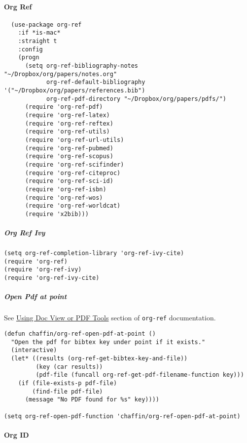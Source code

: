 \documentclass[11pt]{article}
\begin{document}
\paragraph*{Org Ref}
\label{sec:org1457968}

\begin{verbatim}
  (use-package org-ref
    :if *is-mac*
    :straight t
    :config
    (progn
      (setq org-ref-bibliography-notes "~/Dropbox/org/papers/notes.org"
            org-ref-default-bibliography '("~/Dropbox/org/papers/references.bib")
            org-ref-pdf-directory "~/Dropbox/org/papers/pdfs/")
      (require 'org-ref-pdf)
      (require 'org-ref-latex)
      (require 'org-ref-reftex)
      (require 'org-ref-utils)
      (require 'org-ref-url-utils)
      (require 'org-ref-pubmed)
      (require 'org-ref-scopus)
      (require 'org-ref-scifinder)
      (require 'org-ref-citeproc)
      (require 'org-ref-sci-id)
      (require 'org-ref-isbn)
      (require 'org-ref-wos)
      (require 'org-ref-worldcat)
      (require 'x2bib)))
\end{verbatim}

\subparagraph*{Org Ref Ivy}
\label{sec:org4a9ee6e}

\begin{verbatim}
(setq org-ref-completion-library 'org-ref-ivy-cite)
(require 'org-ref)
(require 'org-ref-ivy)
(require 'org-ref-ivy-cite)
\end{verbatim}

\subparagraph*{Open Pdf at point}
\label{sec:org442fd21}

See \href{https://github.com/jkitchin/org-ref/blob/master/org-ref.org\#using-doc-view-or-pdf-tools}{Using Doc View or PDF Tools} section of \texttt{org-ref} documentation.

\begin{verbatim}
(defun chaffin/org-ref-open-pdf-at-point ()
  "Open the pdf for bibtex key under point if it exists."
  (interactive)
  (let* ((results (org-ref-get-bibtex-key-and-file))
         (key (car results))
         (pdf-file (funcall org-ref-get-pdf-filename-function key)))
    (if (file-exists-p pdf-file)
        (find-file pdf-file)
      (message "No PDF found for %s" key))))

(setq org-ref-open-pdf-function 'chaffin/org-ref-open-pdf-at-point)

\end{verbatim}

\paragraph*{Org ID}
\label{sec:org3fe091f}
\end{document}

